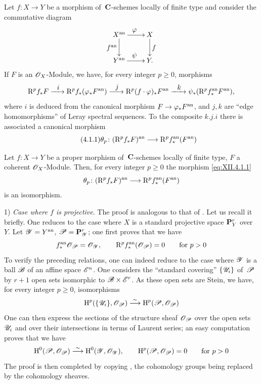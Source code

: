 \subsection{}
\label{XII.4.1}
Let $f \colon X \to Y $ be a morphism of~$\mathbf{C}$-schemes
locally of finite type and consider the commutative diagram
$$
\xymatrix{ X^\an \ar[r]^\varphi \ar[d]_{f^\an} & X \ar[d]^f
\\ Y^\an \ar[r]^\psi & Y \quoi.}
$$
If $F$ is an $\cal{O}_X$-Module, we have, for every integer $p \geq
0$, morphisms
$$
\R^p f_* F \lto{i} \R^p f_* (\varphi_* F^\an )
\lto{j} \R^p (f\cdot\varphi)_* F^\an \lto{k} \psi_*
(\R^p f_*^\an F^\an ) \quoi,
$$
where $i$ is deduced from the canonical morphism $F \to \varphi_*
F^\an $, and $j, k$ are ``edge homomorphisms'' of Leray
spectral sequences. To the composite $k.j.i$ there is associated a
canonical morphism
\begin{equation*}
\label{eq:XII.4.1.1}
\tag{4.1.1} {\theta_p \colon (\R^p f_* F)^\an \to \R^p f_*^\an
(F^\an )}
\end{equation*}

\begin{theorem}
\label{XII.4.2}
Let
$f \colon X \to Y $ be a proper morphism of~$\mathbf{C}$-schemes
locally of finite type, $F$ a coherent
$\cal{O}_X$-Module. Then, for every integer $p \geq 0$ the morphism
\eqref{eq:XII.4.1.1}
$$
\theta_p \colon (\R^p f_* F)^\an \to \R^p f_*^\an (F^\an)
$$
is an isomorphism.
\end{theorem}

1) \emph{Case where $f$ is projective}. The proof is
analogous to that of \cite[]{XII.10}. Let us recall it briefly. One
reduces to the case where $X$ is a standard projective space $\mathbf{P}^r_Y
$ over~$Y$. Let $\cal{Y} = Y^\an$, $\cal{P} = \PP^r_\cal{Y}$;
one first proves that we have
$$
f_*^\an \cal{O}_\cal{P} = \cal{O}_\cal{Y} \quoi, \qquad \R^p f_*^\an
(\cal{O}_\cal{P}) = 0 \qquad \text{for } p>0
$$
To verify the preceding relations, one can indeed
reduce to the case where $\cal{Y}$ is a ball $\cal{B}$ of an
affine space $\cal{E}^n$. One considers the ``standard covering'' $\{
\cal{U}_i \}$ of~$\cal{P}$ by $r+1$ open sets isomorphic to $\cal{B}
\times \cal{E}^r$. As these open sets are Stein, we have, for every
integer $p \geq 0$, isomorphisms
$$
\H^p (\{ \cal{U}_i \}, \cal{O}_\cal{P}) \isomto \H^p (\cal{P},
\cal{O}_\cal{P})
$$
One can then express the sections of the structure sheaf
$\cal{O}_\cal{P}$ over the open sets $\cal{U}_i $ and over their
intersections in terms of Laurent series; an easy computation
proves that we have
$$
\H^0 (\cal{P}, \cal{O}_\cal{P} ) \isomto \H^0 (\cal{Y},
\cal{O}_\cal{Y} ) \quoi, \qquad \H^p (\cal{P}, \cal{O}_\cal{P} ) = 0
\qquad \text{for } p>0
$$
The proof is then completed by copying \cite[
lemma~5]{XII.10}, the cohomology groups being replaced by the
cohomology sheaves.

